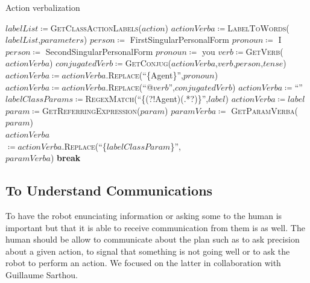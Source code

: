 \documentclass[a4paper,11pt,twoside]{StyleThese}
\begin{document}
\begin{algorithm}[!htb]
	\caption{Action verbalization}
	\label{chap6:algo:action_verba}
	\begin{algorithmic}
	\State $labelList \coloneqq$\textsc{GetClassActionLabels($action$)}
	\State $actionVerba \coloneqq$\textsc{LabelToWords}($labelList$,$parameters$)
		\State $person \coloneqq$ FirstSingularPersonalForm
		\State $pronoun \coloneqq$ I
		\State $person \coloneqq$ SecondSingularPersonalForm
		\State $pronoun \coloneqq$ you
	\EndIf
	\State $verb \coloneqq$\textsc{GetVerb}($actionVerba$)
	\State $conjugatedVerb \coloneqq$\textsc{GetConjug}($actionVerba$,$verb$,$person$,$tense$)
	\State $actionVerba \coloneqq actionVerba.$\textsc{Replace}(``\{Agent\}'',$pronoun$)
	\State $actionVerba \coloneqq actionVerba.$\textsc{Replace}(``@$verb$'',$conjugatedVerb$)
	\EndFunction
	\Statex
	\State $actionVerba \coloneqq$``''
		\State $labelClassParams \coloneqq$\textsc{RegexMatch}(``\{(?!Agent)(.*?)\}'',$label$)
			 
					\State $actionVerba \coloneqq label$
				\EndIf
					\State $param \coloneqq$\textsc{GetReferringExpression($param$)}
				\Else
					\State $paramVerba \coloneqq$ \textsc{GetParamVerba($param$)}\\\hfill{}
				\EndIf
				\State $actionVerba$ \\\hfill $\coloneqq actionVerba.$\textsc{Replace}(``\{$labelClassParam$\}'',\\\hfill$paramVerba$)
				\State \textbf{break}
			\EndIf
			\EndFor
		\EndFor
		\EndIf
	\EndFor
	\EndFunction
	\end{algorithmic}
\end{algorithm}	
	


\subsection{To Understand Communications}
To have the robot enunciating information or asking some to the human is important but that it is able to receive communication from them is as well. The human should be allow to communicate about the plan such as to ask precision about a given action, to signal that something is not going well or to ask the robot to perform an action. We focused on the latter in collaboration with Guillaume Sarthou. 
\end{document}
